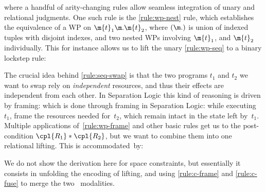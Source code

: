where a handful of arity-changing rules allow seamless integration
of unary and relational judgments.
One such rule is the \ref{rule:wp-nest} rule, which
establishes the equivalence of a WP on $ \m{t}_1 \m. \m{t}_2 $,
where $(\m.)$ is union of indexed tuples with disjoint indexes,
and two nested WPs involving $\m{t}_1$, and $\m{t}_2$ individually.
This for instance allows us to lift the unary \ref{rule:wp-seq}
to a binary lockstep rule:
\begin{derivation}
\end{derivation}

The crucial idea behind \ref{rule:seq-swap} is that the two programs
$t_1$ and $t_2$ we want to swap rely on \emph{independent} resources,
and thus their effects are independent from each other.
In Separation Logic this kind of reasoning is driven by framing:
which is done through framing in Separation Logic:
while executing~$t_1$, frame the resources
needed for~$t_2$, which remain intact in the state left by~$t_1$.
Multiple applications of~\ref{rule:wp-frame} and other basic rules
get us to the post-condition $\cpl{R_1} \ast \cpl{R_2}$, but
we want to combine them into one relational lifting.
This is accommodated~by:
\begin{proofrule}
%
   \label{rule:rl-merge}
\end{proofrule}
We do not show the derivation here for space constraints,
but essentially it consists in unfolding the encoding of lifting,
and using \ref{rule:c-frame} and \ref{rule:c-fuse}
to merge the two \supercond\ modalities.

